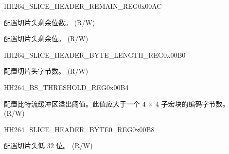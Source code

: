\begin{register}{H}{H264\_SLICE\_HEADER\_REMAIN\_REG}{0x00AC}\label{regdesc:H264SLICEHEADERREMAINREG}
%
%
%
\regnewline%
\begin{regdesc}\begin{reglist}
\label{fielddesc:H264SLICEREMAINBITLENGTH}\item [H264\_SLICE\_REMAIN\_BITLENGTH] 配置切片头剩余位数。 (R/W)
\label{fielddesc:H264SLICEREMAINBIT}\item [H264\_SLICE\_REMAIN\_BIT] 配置切片头剩余位。 (R/W)
\end{reglist}\end{regdesc}
\end{register}


\begin{register}{H}{H264\_SLICE\_HEADER\_BYTE\_LENGTH\_REG}{0x00B0}\label{regdesc:H264SLICEHEADERBYTELENGTHREG}
%
%
\regnewline%
\begin{regdesc}\begin{reglist}
\label{fielddesc:H264SLICEBYTELENGTH}\item [H264\_SLICE\_BYTE\_LENGTH] 配置切片头字节数。 (R/W)
\end{reglist}\end{regdesc}
\end{register}


\begin{register}{H}{H264\_BS\_THRESHOLD\_REG}{0x00B4}\label{regdesc:H264BSTHRESHOLDREG}
%
%
\regnewline%
\begin{regdesc}\begin{reglist}
\label{fielddesc:H264BSBUFFERTHRESHOLD}\item [H264\_BS\_BUFFER\_THRESHOLD] 配置比特流缓冲区溢出阈值。此值应大于一个 4 × 4 子宏块的编码字节数。 (R/W)
\end{reglist}\end{regdesc}
\end{register}


\begin{register}{H}{H264\_SLICE\_HEADER\_BYTE0\_REG}{0x00B8}\label{regdesc:H264SLICEHEADERBYTE0REG}
%
\regnewline
\begin{regdesc}\begin{reglist}
\label{fielddesc:H264SLICEBYTELSB}\item [H264\_SLICE\_BYTE\_LSB] 配置切片头低 32 位。 (R/W)
\end{reglist}\end{regdesc}
\end{register}



